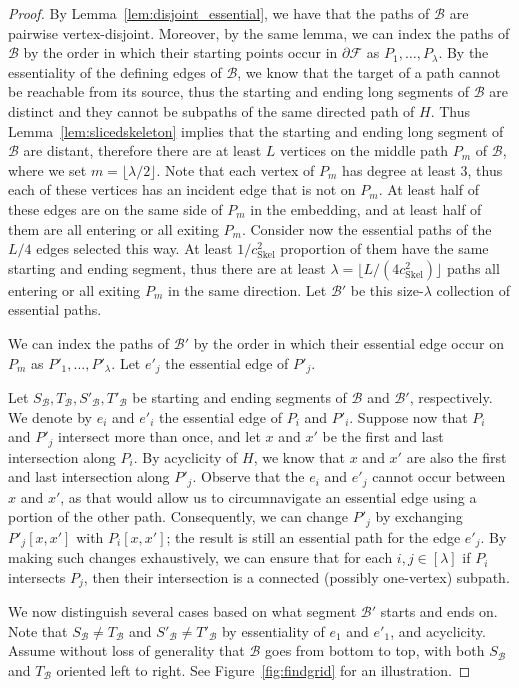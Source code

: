 \documentclass[a4paper,11pt]{article}
\newcommand{\bd}{\partial}
\newcommand{\calB}{\mathcal{B}}
\newcommand{\calF}{\mathcal{F}}
\newcommand{\Skel}{\mathrm{Skel}}
\theoremstyle{plain}
\newtheorem{identification rule}{Identification Rule}
\theoremstyle{definition}
\theoremstyle{remark}
\begin{document}
\begin{proof}
By Lemma~\ref{lem:disjoint_essential}, we have that the paths of $\calB$ are pairwise vertex-disjoint. Moreover, by the same lemma, we can index  the paths of $\calB$ by the order in which their starting points occur in $\bd \calF$ as $P_1,\dots,P_\lambda$. By the essentiality of the defining edges of $\calB$, we know that the target of a path cannot be reachable from its source, thus the starting and ending long segments of $\calB$ are distinct and they cannot be subpaths of the same directed path of $H$. Thus Lemma~\ref{lem:slicedskeleton} implies that the starting and ending long segment of $\calB$ are distant, therefore there are at least $L$ vertices on the middle path $P_m$ of $\calB$, where we set $m=\lfloor \lambda/2 \rfloor$. Note that each vertex of $P_m$ has degree at least $3$, thus each of these vertices has an incident edge that is not on $P_m$. At least half of these edges are on the same side of $P_m$ in the embedding, and at least half of them are all entering or all exiting $P_m$. Consider now the essential paths of the $L/4$ edges selected this way. At least $1/c^2_\Skel$ proportion of them have the same starting and ending segment, thus there are at least $\lambda=\lfloor L/(4c^2_\Skel)\rfloor$ paths all entering or all exiting $P_m$ in the same direction. Let $\calB'$ be this size-$\lambda$ collection of essential paths.

We can index the paths of $\calB'$ by the order in which their essential edge occur on $P_m$ as $P'_1,\dots,P'_\lambda$. Let $e'_j$ the essential edge of $P'_j$.

Let $S_\calB, T_\calB, S'_\calB, T'_\calB$ be starting and ending segments of $\calB$ and $\calB'$, respectively. We denote by $e_i$ and $e'_i$ the essential edge of $P_i$ and $P'_i$. Suppose now that $P_i$ and $P'_j$ intersect more than once, and let $x$ and $x'$ be the first and last intersection along $P_i$. By acyclicity of $H$, we know that $x$ and $x'$ are also the first and last intersection along $P'_j$. Observe that the $e_i$ and $e'_j$ cannot occur between $x$ and $x'$, as that would allow us to circumnavigate an essential edge using a portion of the other path. Consequently, we can change $P'_j$ by exchanging $P'_j[x,x']$ with $P_i[x,x']$; the result is still an essential path for the edge $e'_j$. By making such changes exhaustively, we can ensure that for each $i,j\in [\lambda]$ if $P_i$ intersects $P_j$, then their intersection is a connected (possibly one-vertex) subpath. 

We now distinguish several cases based on what segment $\calB'$ starts and ends on.  Note that $S_\calB\neq T_\calB$ and $S'_\calB\neq T'_\calB$ by essentiality of $e_1$ and $e'_1$, and acyclicity. Assume without loss of generality that $\calB$ goes from bottom to top, with both $S_\calB$ and $T_\calB$ oriented left to right. See Figure~\ref{fig:findgrid}	 for an illustration.



\end{proof}
\end{document}
